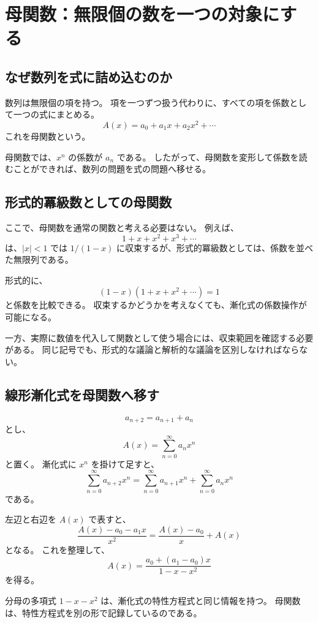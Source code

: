
\section{母関数：無限個の数を一つの対象にする}

\subsection{なぜ数列を式に詰め込むのか}

数列は無限個の項を持つ。
項を一つずつ扱う代わりに、すべての項を係数として一つの式にまとめる。
\[
  A(x)=a_0+a_1x+a_2x^2+\cdots
\]
これを母関数という。

母関数では、$x^n$ の係数が $a_n$ である。
したがって、母関数を変形して係数を読むことができれば、数列の問題を式の問題へ移せる。

\subsection{形式的冪級数としての母関数}

ここで、母関数を通常の関数と考える必要はない。
例えば、
\[
  1+x+x^2+x^3+\cdots
\]
は、$|x|<1$ では $1/(1-x)$ に収束するが、形式的冪級数としては、係数を並べた無限列である。

形式的に、
\[
  (1-x)(1+x+x^2+\cdots)=1
\]
と係数を比較できる。
収束するかどうかを考えなくても、漸化式の係数操作が可能になる。

一方、実際に数値を代入して関数として使う場合には、収束範囲を確認する必要がある。
同じ記号でも、形式的な議論と解析的な議論を区別しなければならない。

\subsection{線形漸化式を母関数へ移す}

\[
  a_{n+2}=a_{n+1}+a_n
\]
とし、
\[
  A(x)=\sum_{n=0}^{\infty}a_nx^n
\]
と置く。
漸化式に $x^n$ を掛けて足すと、
\[
  \sum_{n=0}^{\infty}a_{n+2}x^n
  =
  \sum_{n=0}^{\infty}a_{n+1}x^n
  +
  \sum_{n=0}^{\infty}a_nx^n
\]
である。

左辺と右辺を $A(x)$ で表すと、
\[
  \frac{A(x)-a_0-a_1x}{x^2}
  =
  \frac{A(x)-a_0}{x}+A(x)
\]
となる。
これを整理して、
\[
  A(x)=\frac{a_0+(a_1-a_0)x}{1-x-x^2}
\]
を得る。

分母の多項式 $1-x-x^2$ は、漸化式の特性方程式と同じ情報を持つ。
母関数は、特性方程式を別の形で記録しているのである。

